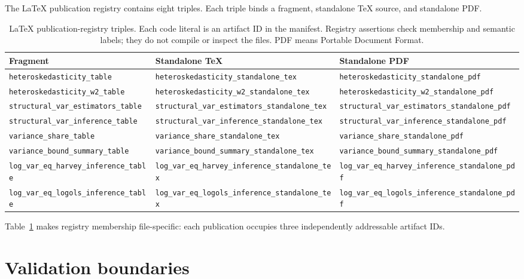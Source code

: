 \documentclass[11pt]{article}
\DeclareRobustCommand{\code}[1]{%
  \ifmmode\text{\ttfamily\detokenize{#1}}\else\nolinkurl{#1}\fi}
\begin{document}
The LaTeX publication registry contains eight triples. Each triple binds a
fragment, standalone TeX source, and standalone PDF.
\begin{table}[htbp]
\centering
\scriptsize
\caption{LaTeX publication-registry triples. Each code literal is an artifact
ID in the manifest. Registry assertions check membership and semantic labels;
they do not compile or inspect the files. PDF means Portable Document Format.
\label{tab:latex-publications}}
\begin{tabular}{@{}p{}p{}p{}@{}}
\toprule
Fragment & Standalone TeX & Standalone PDF\\
\midrule
\code{heteroskedasticity_table} & \code{heteroskedasticity_standalone_tex} & \code{heteroskedasticity_standalone_pdf}\\
\code{heteroskedasticity_w2_table} & \code{heteroskedasticity_w2_standalone_tex} & \code{heteroskedasticity_w2_standalone_pdf}\\
\code{structural_var_estimators_table} & \code{structural_var_estimators_standalone_tex} & \code{structural_var_estimators_standalone_pdf}\\
\code{structural_var_inference_table} & \code{structural_var_inference_standalone_tex} & \code{structural_var_inference_standalone_pdf}\\
\code{variance_share_table} & \code{variance_share_standalone_tex} & \code{variance_share_standalone_pdf}\\
\code{variance_bound_summary_table} & \code{variance_bound_summary_standalone_tex} & \code{variance_bound_summary_standalone_pdf}\\
\code{log_var_eq_harvey_inference_table} & \code{log_var_eq_harvey_inference_standalone_tex} & \code{log_var_eq_harvey_inference_standalone_pdf}\\
\code{log_var_eq_logols_inference_table} & \code{log_var_eq_logols_inference_standalone_tex} & \code{log_var_eq_logols_inference_standalone_pdf}\\
\bottomrule
\end{tabular}
\end{table}
Table~\ref{tab:latex-publications} makes registry membership file-specific: each
publication occupies three independently addressable artifact IDs.

\section{Validation boundaries}
\label{sec:validation}
\end{document}
